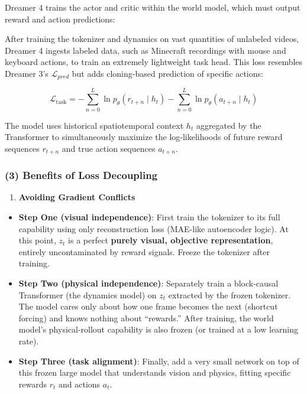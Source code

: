 Dreamer 4 trains the actor and critic within the world model, which must output reward and action predictions:

After training the tokenizer and dynamics on vast quantities of unlabeled videos, Dreamer 4 ingests labeled data, such as Minecraft recordings with mouse and keyboard actions, to train an extremely lightweight task head. This loss resembles Dreamer 3's \(\mathcal{L}_{pred}\) but adds cloning-based prediction of specific actions:

\[
\mathcal{L}_{\mathrm{task}}=-\sum_{n=0}^{L}\ln p_{\theta}(r_{t+n}\mid h_t)-\sum_{n=0}^{L}\ln p_{\theta}(a_{t+n}\mid h_t)
\]

The model uses historical spatiotemporal context \(h_t\) aggregated by the Transformer to simultaneously maximize the log-likelihoods of future reward sequences \(r_{t+n}\) and true action sequences \(a_{t+n}\).

\hypertarget{benefits-of-loss-decoupling}{%
\subsubsection{(3) Benefits of Loss Decoupling}\label{benefits-of-loss-decoupling}}

\begin{enumerate}
\def\labelenumi{\arabic{enumi}.}
\tightlist
\item
  \textbf{Avoiding Gradient Conflicts}
\end{enumerate}

\begin{itemize}
\tightlist
\item
  \textbf{Step One (visual independence)}: First train the tokenizer to its full capability using only reconstruction loss (MAE-like autoencoder logic). At this point, \(z_t\) is a perfect \textbf{purely visual, objective representation}, entirely uncontaminated by reward signals. Freeze the tokenizer after training.
\item
  \textbf{Step Two (physical independence)}: Separately train a block-causal Transformer (the dynamics model) on \(z_t\) extracted by the frozen tokenizer. The model cares only about how one frame becomes the next (shortcut forcing) and knows nothing about ``rewards.'' After training, the world model's physical-rollout capability is also frozen (or trained at a low learning rate).
\item
  \textbf{Step Three (task alignment)}: Finally, add a very small network on top of this frozen large model that understands vision and physics, fitting specific rewards \(r_t\) and actions \(a_t\).
\end{itemize}

